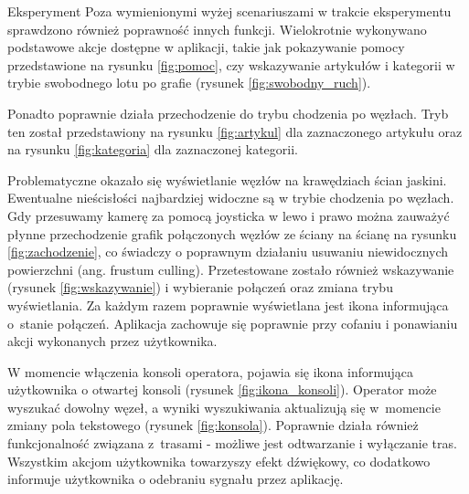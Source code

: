 \begin{chapter}{Eksperyment}
Poza wymienionymi wyżej scenariuszami w trakcie eksperymentu sprawdzono również poprawność innych funkcji. Wielokrotnie wykonywano podstawowe akcje dostępne w aplikacji, takie jak pokazywanie pomocy przedstawione na rysunku \ref{fig:pomoc}, czy wskazywanie artykułów i kategorii w trybie swobodnego lotu po grafie (rysunek \ref{fig:swobodny_ruch}). 

Ponadto poprawnie działa przechodzenie do trybu chodzenia po węzłach. Tryb ten został przedstawiony na rysunku \ref{fig:artykul} dla zaznaczonego artykułu oraz na rysunku \ref{fig:kategoria} dla zaznaczonej kategorii. 



Problematyczne okazało się wyświetlanie węzłów na krawędziach ścian jaskini. Ewentualne nieścisłości najbardziej widoczne są w trybie chodzenia po węzłach. Gdy przesuwamy kamerę za pomocą joysticka w lewo i prawo można zauważyć płynne przechodzenie grafik połączonych węzłów ze ściany na ścianę na rysunku \ref{fig:zachodzenie}, co świadczy o poprawnym działaniu usuwaniu niewidocznych powierzchni (ang. frustum culling). 
Przetestowane zostało również wskazywanie (rysunek \ref{fig:wskazywanie}) i wybieranie połączeń oraz zmiana trybu wyświetlania. Za każdym razem poprawnie wyświetlana jest ikona informująca o~stanie połączeń. Aplikacja zachowuje się poprawnie przy cofaniu i ponawianiu akcji wykonanych przez użytkownika. 



W momencie włączenia konsoli operatora, pojawia się ikona informująca użytkownika o otwartej konsoli (rysunek \ref{fig:ikona_konsoli}). Operator może wyszukać dowolny węzeł, a wyniki wyszukiwania aktualizują się w~momencie zmiany pola tekstowego (rysunek \ref{fig:konsola}). Poprawnie działa również funkcjonalność związana z~trasami - możliwe jest odtwarzanie i wyłączanie tras. Wszystkim akcjom użytkownika towarzyszy efekt dźwiękowy, co dodatkowo informuje użytkownika o odebraniu sygnału przez aplikację.


\end{chapter}
